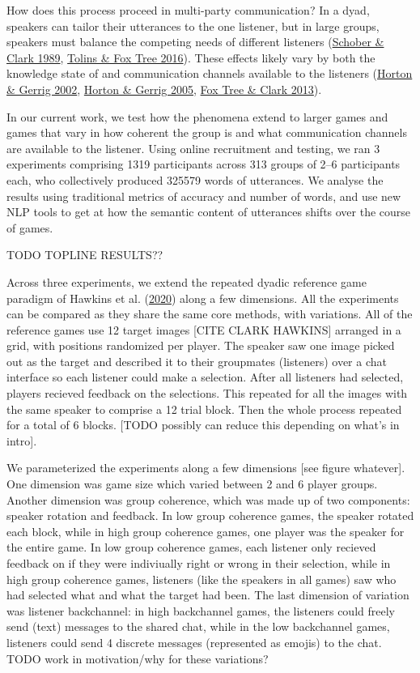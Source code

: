 \documentclass[
  english,
  a4paper,
]{article}
\begin{document}
How does this process proceed in multi-party communication? In a dyad, speakers can tailor their utterances to the one listener, but in large groups, speakers must balance the competing needs of different listeners (\protect\hyperlink{ref-schober1989}{Schober \& Clark 1989}, \protect\hyperlink{ref-tolins2016}{Tolins \& Fox Tree 2016}). These effects likely vary by both the knowledge state of and communication channels available to the listeners (\protect\hyperlink{ref-horton2002}{Horton \& Gerrig 2002}, \protect\hyperlink{ref-horton2005}{Horton \& Gerrig 2005}, \protect\hyperlink{ref-fox-tree2013}{Fox Tree \& Clark 2013}).

In our current work, we test how the phenomena extend to larger games and games that vary in how coherent the group is and what communication channels are available to the listener. Using online recruitment and testing, we ran 3 experiments comprising 1319 participants across 313 groups of 2--6 participants each, who collectively produced 325579 words of utterances. We analyse the results using traditional metrics of accuracy and number of words, and use new NLP tools to get at how the semantic content of utterances shifts over the course of games.

TODO TOPLINE RESULTS??

Across three experiments, we extend the repeated dyadic reference game paradigm of Hawkins et al. (\protect\hyperlink{ref-hawkinsCharacterizingDynamicsLearning2020}{2020}) along a few dimensions. All the experiments can be compared as they share the same core methods, with variations. All of the reference games use 12 target images {[}CITE CLARK HAWKINS{]} arranged in a grid, with positions randomized per player. The speaker saw one image picked out as the target and described it to their groupmates (listeners) over a chat interface so each listener could make a selection. After all listeners had selected, players recieved feedback on the selections. This repeated for all the images with the same speaker to comprise a 12 trial block. Then the whole process repeated for a total of 6 blocks. {[}TODO possibly can reduce this depending on what's in intro{]}.

We parameterized the experiments along a few dimensions {[}see figure whatever{]}. One dimension was game size which varied between 2 and 6 player groups. Another dimension was group coherence, which was made up of two components: speaker rotation and feedback. In low group coherence games, the speaker rotated each block, while in high group coherence games, one player was the speaker for the entire game. In low group coherence games, each listener only recieved feedback on if they were indiviually right or wrong in their selection, while in high group coherence games, listeners (like the speakers in all games) saw who had selected what and what the target had been. The last dimension of variation was listener backchannel: in high backchannel games, the listeners could freely send (text) messages to the shared chat, while in the low backchannel games, listeners could send 4 discrete messages (represented as emojis) to the chat.
TODO work in motivation/why for these variations?
\end{document}
